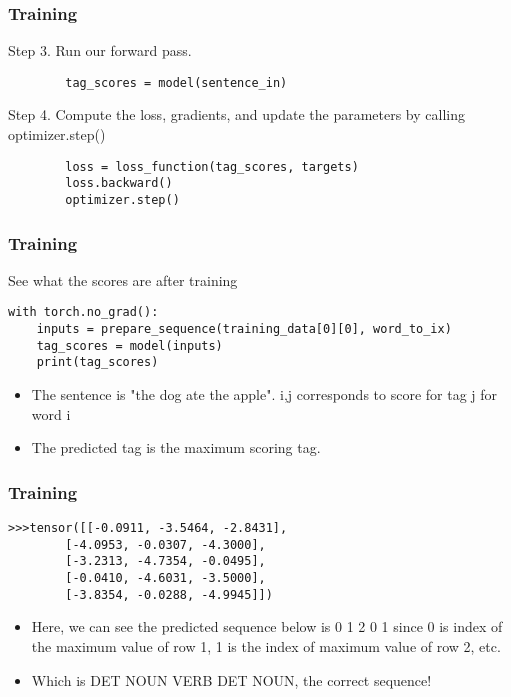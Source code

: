 \begin{frame}[fragile]
\frametitle{Training}
Step 3. Run our forward pass.
\begin{lstlisting}
		tag_scores = model(sentence_in)
\end{lstlisting}     
Step 4. Compute the loss, gradients, and update the parameters by calling optimizer.step()
\begin{lstlisting}
        loss = loss_function(tag_scores, targets)
        loss.backward()
        optimizer.step()
\end{lstlisting}      
\end{frame} 

\begin{frame}[fragile]
\frametitle{Training}
See what the scores are after training
\begin{lstlisting}
with torch.no_grad():
    inputs = prepare_sequence(training_data[0][0], word_to_ix)
    tag_scores = model(inputs)
	print(tag_scores)
\end{lstlisting} 
\begin{itemize}
\item The sentence is "the dog ate the apple".  i,j corresponds to score for tag j for word i
\item The predicted tag is the maximum scoring tag.
\end{itemize}
   
\end{frame} 

\begin{frame}[fragile]
\frametitle{Training}
\begin{lstlisting}
>>>tensor([[-0.0911, -3.5464, -2.8431],
        [-4.0953, -0.0307, -4.3000],
        [-3.2313, -4.7354, -0.0495],
        [-0.0410, -4.6031, -3.5000],
        [-3.8354, -0.0288, -4.9945]])	
\end{lstlisting}     
\begin{itemize}
\item Here, we can see the predicted sequence below is 0 1 2 0 1 since 0 is index of the maximum value of row 1, 1 is the index of maximum value of row 2, etc. 
\item Which is DET NOUN VERB DET NOUN, the correct sequence!
\end{itemize}    
\end{frame} 



